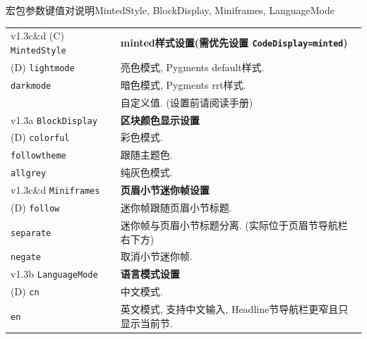 \begin{frame}{ 宏包参数键值对说明}{MintedStyle, BlockDisplay, Miniframes, LanguageMode}
	\begin{table}[h]
		\centering
		\begin{tabular}{>{\raggedleft\arraybackslash}p{}p{}}
			v1.3c\&d (C) \alert{\texttt{MintedStyle}} & \textbf{minted样式设置(需优先设置 \texttt{\alert{CodeDisplay}=minted})}\\
			(D) \texttt{lightmode} & 亮色模式, Pygments default样式.\\
			\texttt{darkmode} & 暗色模式, Pygments rrt样式.\\
			\Arg{custom} & 自定义值. (设置前请阅读手册)\\
			\midrule
			v1.3a \alert{\texttt{BlockDisplay}} & \textbf{区块颜色显示设置}\\
			(D) \texttt{colorful} & 彩色模式.\\
			\texttt{followtheme} & 跟随主题色.\\
			\texttt{allgrey} & 纯灰色模式.\\
			\midrule
			v1.3c\&d \alert{\texttt{Miniframes}} & \textbf{页眉小节迷你帧设置}\\
			(D) \texttt{follow} & 迷你帧跟随页眉小节标题.\\
			\texttt{separate} & 迷你帧与页眉小节标题分离. (实际位于页眉节导航栏右下方)\\
			\texttt{negate} & 取消小节迷你帧.\\
			\midrule
			v1.3b \alert{\texttt{LanguageMode}} & \textbf{语言模式设置}\\
			(D) \texttt{cn} & 中文模式.\\
			\texttt{en} & 英文模式, 支持中文输入, Headline节导航栏更窄且只显示当前节.\\
		\end{tabular}
	\end{table}
	\vspace*{-2ex}
\end{frame}

